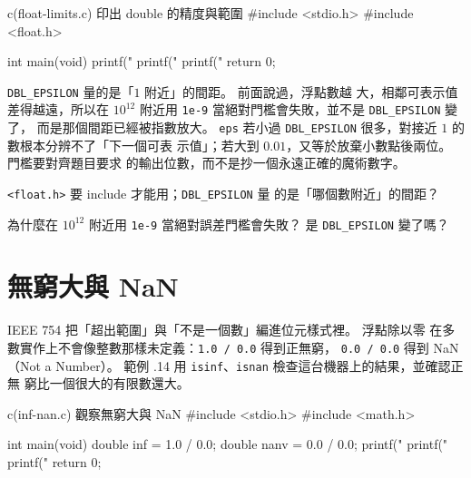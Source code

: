 \begin{example}{c}{(float-limits.c) 印出 double 的精度與範圍}
#include <stdio.h>
#include <float.h>

int main(void) {
    printf("%
    printf("%
    printf("%
    return 0;
}
\end{example}


\texttt{DBL\_EPSILON} 量的是「$1$ 附近」的間距。 前面說過，浮點數越
大，相鄰可表示值差得越遠，所以在 $10^{12}$ 附近用
\texttt{1e-9} 當絕對門檻會失敗，並不是 \texttt{DBL\_EPSILON} 變了，
而是那個間距已經被指數放大。 \texttt{eps} 若小過
\texttt{DBL\_EPSILON} 很多，對接近 $1$ 的數根本分辨不了「下一個可表
示值」；若大到 $0.01$，又等於放棄小數點後兩位。 門檻要對齊題目要求
的輸出位數，而不是抄一個永遠正確的魔術數字。

\begin{drills}[label=drills:float-limits]
\item \texttt{<float.h>} 要 include 才能用；\texttt{DBL\_EPSILON} 量
的是「哪個數附近」的間距？
\item 為什麼在 $10^{12}$ 附近用 \texttt{1e-9} 當絕對誤差門檻會失敗？
是 \texttt{DBL\_EPSILON} 變了嗎？
\end{drills}

\section{無窮大與 NaN}
\label{sec:float-inf-nan}

IEEE 754 把「超出範圍」與「不是一個數」編進位元樣式裡。 浮點除以零
在多數實作上不會像整數那樣未定義：\texttt{1.0 / 0.0} 得到正無窮，
\texttt{0.0 / 0.0} 得到 NaN（Not a Number）。 範例 \thechapter.14
用 \texttt{isinf}、\texttt{isnan} 檢查這台機器上的結果，並確認正無
窮比一個很大的有限數還大。

\begin{example}{c}{(inf-nan.c) 觀察無窮大與 NaN}
#include <stdio.h>
#include <math.h>

int main(void) {
    double inf = 1.0 / 0.0;
    double nanv = 0.0 / 0.0;
    printf("%
    printf("%
    printf("%
    return 0;
}
\end{example}


